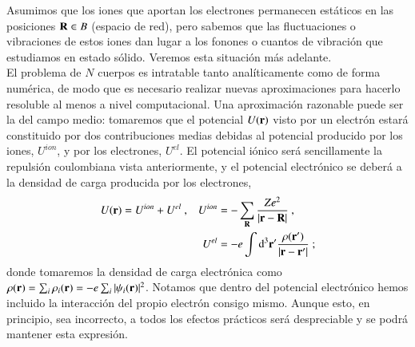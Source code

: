 Asumimos que los iones que aportan los electrones permanecen estáticos en las posiciones $\mathbf{R}\in B$ (espacio de red), pero sabemos que las fluctuaciones o vibraciones de estos iones dan lugar a los fonones o cuantos de vibración que estudiamos en estado sólido. Veremos esta situación más adelante. \\

El problema de $N$ cuerpos es intratable tanto analíticamente como de forma numérica, de modo que es necesario realizar nuevas aproximaciones para hacerlo resoluble al menos a nivel computacional. Una aproximación razonable puede ser la del campo medio: tomaremos que el potencial $U(\mathbf{r})$ visto por un electrón estará constituido por dos contribuciones medias debidas al potencial producido por los iones, $U^{ion}$, y por los electrones, $U^{el}$. El potencial iónico será sencillamente la repulsión coulombiana vista anteriormente, y el potencial electrónico se deberá a la densidad de carga producida por los electrones, 
\begin{align}
    U(\B{r}) &= U^{ion} + U^{el} \ ,& U^{ion} &= -\sum_{\B{R}} \frac{Ze^2}{|\B{r} - \B{R}|}\ , \\
             &                   & U^{el}  &= -e\int \D[3]{\B{r'}} \frac{\rho(\B{r'})}{|\B{r} - \B{r'}|}\ ; 
\end{align}
donde tomaremos la densidad de carga electrónica como $\rho(\mathbf{r}) = \sum_i \rho_i (\mathbf{r}) = -e\sum_i |\psi_i (\mathbf{r})|^2$. Notamos que dentro del potencial electrónico hemos incluido la interacción del propio electrón consigo mismo. Aunque esto, en principio, sea incorrecto, a todos los efectos prácticos será despreciable y se podrá mantener esta expresión. \\

